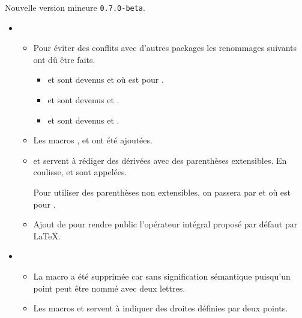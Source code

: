 Nouvelle version mineure \verb+0.7.0-beta+.

\begin{itemize}[itemsep=.5em]
    \item {}
    \begin{itemize}[itemsep=.5em]
        \item Pour éviter des conflits avec d'autres packages les renommages suivants ont dû être faits.
        \begin{itemize}[itemsep=.5em, label=$\rightarrow$]
            \item {} et  sont devenus  et  où  est pour .

            \item {} et  sont devenus  et .

            \item {} et  sont devenus  et .
        \end{itemize}

		\item Les macros ,  et  ont été ajoutées.

 		\item {} et  servent à rédiger des dérivées avec des parenthèses extensibles. En coulisse,  et  sont appelées.

        Pour utiliser des parenthèses non extensibles, on passera par  et  où  est pour .

		\item Ajout de  pour rendre public l'opérateur intégral proposé par défaut par \LaTeX.
    \end{itemize}




    \item {}
    \begin{itemize}[itemsep=.5em]
        \item La macro  a été supprimée car sans signification sémantique puisqu'un point peut être nommé avec deux lettres.

        \item Les macros  et  servent à indiquer des droites définies par deux points.


\end{itemize}
\end{itemize}
